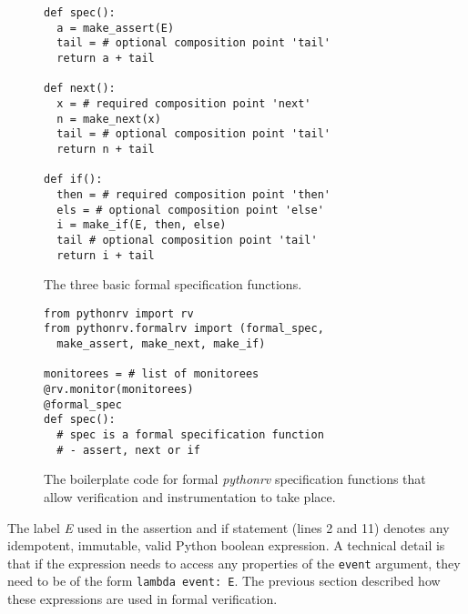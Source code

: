 \documentclass[a4paper,11pt]{kth-mag}
\begin{document}
\begin{figure}[h!]
	\begin{center}
	\begin{minipage}{0.7\textwidth}
	\begin{lstlisting}
def spec():
  a = make_assert(E)
  tail = # optional composition point 'tail'
  return a + tail

def next():
  x = # required composition point 'next'
  n = make_next(x)
  tail = # optional composition point 'tail'
  return n + tail

def if():
  then = # required composition point 'then'
  els = # optional composition point 'else'
  i = make_if(E, then, else)
  tail # optional composition point 'tail'
  return i + tail
	\end{lstlisting}
	\end{minipage}
	\end{center}

	\caption{The three basic formal specification functions.}
	\label{figure-basic-formal-specification-functions}
\end{figure}

\begin{figure}[h!]
	\begin{center}
	\begin{minipage}{0.7\textwidth}
	\begin{lstlisting}
from pythonrv import rv
from pythonrv.formalrv import (formal_spec,
  make_assert, make_next, make_if)

monitorees = # list of monitorees
@rv.monitor(monitorees)
@formal_spec
def spec():
  # spec is a formal specification function
  # - assert, next or if
	\end{lstlisting}
	\end{minipage}
	\end{center}

  \caption{The boilerplate code for formal \textit{pythonrv} specification
  functions that allow verification and instrumentation to take place.}
	\label{figure-formal-boilerplate}
\end{figure}

The label \textit{E} used in the assertion and if statement (lines 2 and 11)
denotes any idempotent, immutable, valid Python boolean expression. A technical
detail is that if the expression needs to access any properties of the
\texttt{event} argument, they need to be of the form \texttt{lambda event: E}.
The previous section described how these expressions are used in formal
verification.
\end{document}

